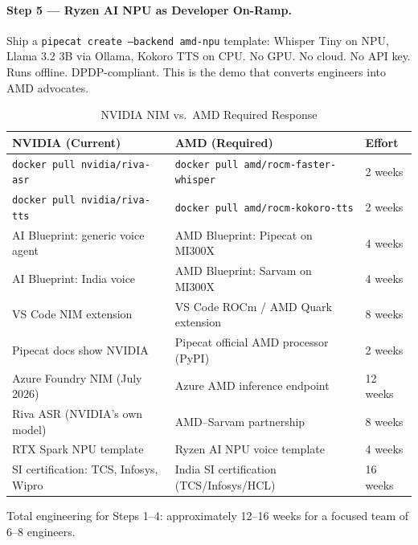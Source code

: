\documentclass[12pt,a4paper]{article}
\begin{document}
\paragraph{Step 5 --- Ryzen AI NPU as Developer On-Ramp.}
Ship a \texttt{pipecat create --backend amd-npu} template: Whisper Tiny on
NPU, Llama 3.2 3B via Ollama, Kokoro TTS on CPU.  No GPU.  No cloud.  No
API key.  Runs offline.  DPDP-compliant.  This is the demo that converts
engineers into AMD advocates.

\begin{table}[H]\centering
\caption{NVIDIA NIM vs.\ AMD Required Response}
\label{tab:nim-vs-amd}
\small
\begin{tabularx}{\textwidth}{L{4.2cm}L{4.2cm}X}
\toprule
\textbf{NVIDIA (Current)} & \textbf{AMD (Required)} & \textbf{Effort} \\
\midrule
\texttt{docker pull nvidia/riva-asr}     & \texttt{docker pull amd/rocm-faster-whisper} & 2 weeks \\
\texttt{docker pull nvidia/riva-tts}     & \texttt{docker pull amd/rocm-kokoro-tts}      & 2 weeks \\
AI Blueprint: generic voice agent        & AMD Blueprint: Pipecat on MI300X              & 4 weeks \\
AI Blueprint: India voice                & AMD Blueprint: Sarvam on MI300X               & 4 weeks \\
VS Code NIM extension                    & VS Code ROCm / AMD Quark extension            & 8 weeks \\
Pipecat docs show NVIDIA                 & Pipecat official AMD processor (PyPI)         & 2 weeks \\
Azure Foundry NIM (July 2026)            & Azure AMD inference endpoint                  & 12 weeks \\
Riva ASR (NVIDIA's own model)            & AMD--Sarvam partnership                       & 8 weeks \\
RTX Spark NPU template                   & Ryzen AI NPU voice template                   & 4 weeks \\
SI certification: TCS, Infosys, Wipro    & India SI certification (TCS/Infosys/HCL)      & 16 weeks \\
\bottomrule
\end{tabularx}
\end{table}

Total engineering for Steps 1--4: approximately 12--16 weeks for a focused
team of 6--8 engineers.

\end{document}
